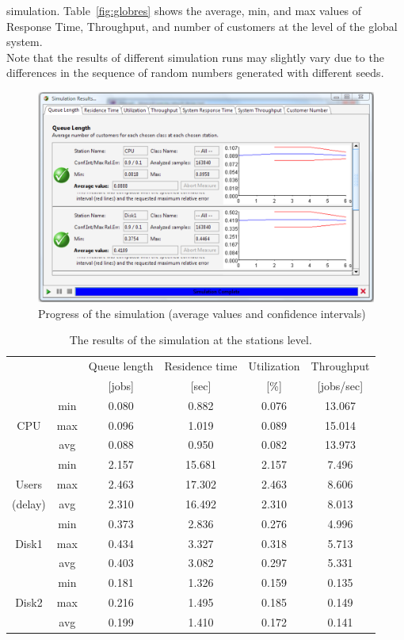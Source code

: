 simulation. Table~\ref{fig:globres} shows the average, min, and
max values of Response Time, Throughput, and number of customers
at the level of the global system.\\
Note that the results of different simulation runs may slightly
vary due to the differences in the sequence of random numbers
generated with different seeds.
\begin{figure}[htb]
    \begin{center}
        \includegraphics[scale=.5]{img/jsimg/12.15.eps}
    \end{center}
    \caption{Progress of the simulation (average values and confidence
    intervals)}
    \label{fig:simres}
\end{figure}

\begin{table}
\begin{center}
  \begin{tabular}{|c|c||c|c|c|c|}
\hline
  &&Queue length&Residence time&Utilization  &Throughput \\
    &&[jobs]&[sec]&[\%]  &[jobs/sec] \\ \hline
         &min  &0.080  &0.882&0.076&13.067  \\
     CPU &max  &0.096  &1.019&0.089&15.014  \\
         &avg  &0.088  &0.950&0.082&13.973  \\ \hline
         &min  &2.157  &15.681&2.157&7.496  \\
   Users &max  &2.463  &17.302&2.463&8.606  \\
   (delay)&avg  &2.310  &16.492&2.310&8.013  \\ \hline
         &min  &0.373  &2.836&0.276&4.996  \\
    Disk1&max  &0.434  &3.327&0.318&5.713  \\
             &avg  &0.403  &3.082&0.297&5.331  \\ \hline
         &min  &0.181  &1.326&0.159&0.135  \\
    Disk2&max  &0.216  &1.495&0.185&0.149  \\
         &avg  &0.199  &1.410&0.172&0.141  \\ \hline
      \end{tabular}\\
\end{center}
 \caption{The results of the simulation at the stations level.}
 \label{fig:ressm1}
\end{table}

